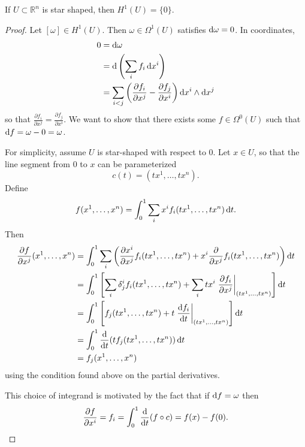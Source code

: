 \begin{lemma}
If $U \subset \mathbb{R}^n$ is star shaped, then $H^1(U) = \{ 0 \}$.
\end{lemma}
\begin{proof}
Let $[\omega] \in H^1(U)$. Then $\omega \in \Omega^1(U)$ satisfies
$\mathop{}\!\mathrm{d} \omega = 0$. In coordinates,
\begin{align*}
   0
&= \mathop{}\!\mathrm{d} \omega \\
&= \mathop{}\!\mathrm{d} \left(\sum_i f_i \mathop{}\!\mathrm{d} x^i\right) \\
&= \sum_{i < j}
     \left(
       \frac{\partial f_i}{\partial x^j}
     - \frac{\partial f_j}{\partial x^i}
    \right)
    \mathop{}\!\mathrm{d} x^i \wedge \mathop{}\!\mathrm{d} x^j
\end{align*}
so that $\frac{\partial f_i}{\partial x^j} = \frac{\partial
  f_j}{\partial x^i}$.
We want to show that there exists some
$f \in \Omega^0(U)$ such that
$\mathop{}\!\mathrm{d} f = \omega - 0 = \omega$.

For simplicity, assume $U$ is star-shaped with respect to 0.
Let $x \in U$, so that the line segment from 0 to $x$ can be
parameterized
$$
  c(t)
= (t x^1, \dots, t x^n).
$$
Define
$$
  f(x^1, \dots, x^n)
= \int_0^1
    \sum_i
      x^i f_i(tx^1, \dots, tx^n)
      \mathop{}\!\mathrm{d} t.
$$
Then
\begin{align*}
   \frac{\partial f}
        {\partial x^j}
   (x^1, \dots, x^n)
&= \int_0^1
     \sum_i
       \left(
         \frac{\partial x^i}{\partial x^j}
           f_i(tx^1, \dots, t x^n)
       + x^i
         \frac{\partial}{\partial x^j}
           f_i(tx^1, \dots, tx^n)
       \right) \dif t\\
&= \int_0^1
     \left[
       \sum_i
         \delta^i_j
         f_i(tx^1, \dots, tx^n)
     + \sum_i
         t x^i
         \left.
           \frac{\partial f_i}{\partial x^j}
         \right|_{(tx^1, \dots, tx^n)}
     \right] \dif t \\
&= \int_0^1
     \left[
       f_j(t x^1, \dots, tx^n)
     + t
       \left.
         \frac{\dif f_i}{\dif t}
       \right|_{(tx^1, \dots, tx^n)}
     \right] \dif t \\
&= \int_0^1
     \frac{\dif}{\dif t}
     (t f_j(tx^1, \dots, t x^n))
     \dif t \\
&= f_j(x^1, \dots, x^n)
\end{align*}
using the condition found above on the partial derivatives.

This choice of integrand is motivated by the fact that if $\mathop{}\!\mathrm{d} f =
\omega$ then
$$
  \frac{\partial f}{\partial x^i}
= f_i
= \int_0^1 \frac{\mathop{}\!\mathrm{d}}{\mathop{}\!\mathrm{d} t}(f \circ c)
= f(x) - f(0).
$$
\end{proof}

